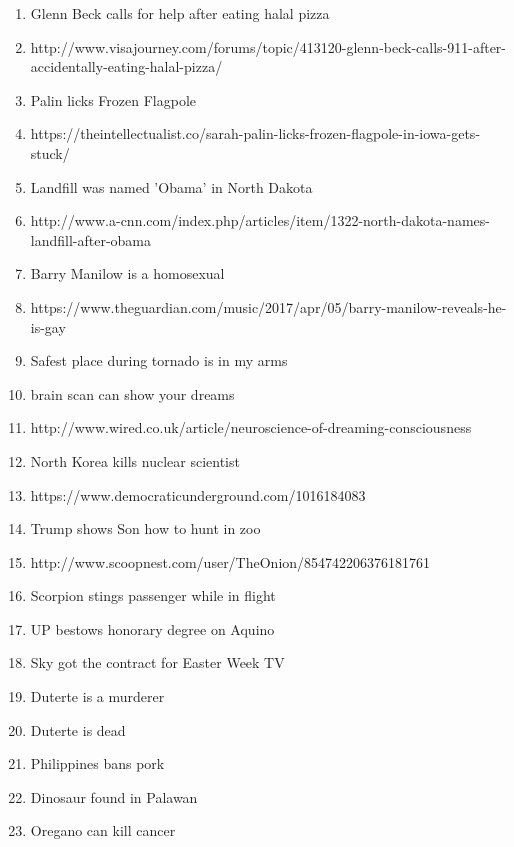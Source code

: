 \documentclass[journal]{./IEEEtran}
\begin{document}
\begin{enumerate}
		\item Glenn Beck calls for help after eating halal pizza
		\item http://www.visajourney.com/forums/topic/413120-glenn-beck-calls-911-after-accidentally-eating-halal-pizza/
		\item Palin licks Frozen Flagpole
		\item https://theintellectualist.co/sarah-palin-licks-frozen-flagpole-in-iowa-gets-stuck/
		\item Landfill was named 'Obama' in North Dakota
		\item http://www.a-cnn.com/index.php/articles/item/1322-north-dakota-names-landfill-after-obama
		\item Barry Manilow is a homosexual
		\item https://www.theguardian.com/music/2017/apr/05/barry-manilow-reveals-he-is-gay
		\item Safest place during tornado is in my arms
		\item brain scan can show your dreams
		\item http://www.wired.co.uk/article/neuroscience-of-dreaming-consciousness
		\item North Korea kills nuclear scientist
		\item https://www.democraticunderground.com/1016184083
		\item Trump shows Son how to hunt in zoo
		\item http://www.scoopnest.com/user/TheOnion/854742206376181761
		\item Scorpion stings passenger while in flight
		\item UP bestows honorary degree on Aquino
		\item Sky got the contract for Easter Week TV
		\item Duterte is a murderer
		\item Duterte is dead
		\item Philippines bans pork
		\item Dinosaur found in Palawan
		\item Oregano can kill cancer
	\end{enumerate}
	\newpage
\end{document}
